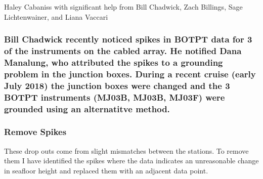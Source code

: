 \documentclass[11pt]{article}
\begin{document}
    Haley Cabaniss with significant help from Bill Chadwick, Zach Billings,
Sage Lichtenwainer, and Liana Vaccari

\hypertarget{bill-chadwick-recently-noticed-spikes-in-botpt-data-for-3-of-the-instruments-on-the-cabled-array.-he-notified-dana-manalung-who-attributed-the-spikes-to-a-grounding-problem-in-the-junction-boxes.-during-a-recent-cruise-early-july-2018-the-junction-boxes-were-changed-and-the-3-botpt-instruments-mj03b-mj03b-mj03f-were-grounded-using-an-alternatitve-method.}{%
\subsubsection{Bill Chadwick recently noticed spikes in BOTPT data for 3
of the instruments on the cabled array. He notified Dana Manalung, who
attributed the spikes to a grounding problem in the junction boxes.
During a recent cruise (early July 2018) the junction boxes were changed
and the 3 BOTPT instruments (MJ03B, MJ03B, MJ03F) were grounded using an
alternatitve
method.}\label{bill-chadwick-recently-noticed-spikes-in-botpt-data-for-3-of-the-instruments-on-the-cabled-array.-he-notified-dana-manalung-who-attributed-the-spikes-to-a-grounding-problem-in-the-junction-boxes.-during-a-recent-cruise-early-july-2018-the-junction-boxes-were-changed-and-the-3-botpt-instruments-mj03b-mj03b-mj03f-were-grounded-using-an-alternatitve-method.}}

\hypertarget{remove-spikes}{%
\subsubsection{Remove Spikes}\label{remove-spikes}}

These drop outs come from slight mismatches between the stations. To
remove them I have identified the spikes where the data indicates an
unreasonable change in seafloor height and replaced them with an
adjacent data point.
\end{document}
